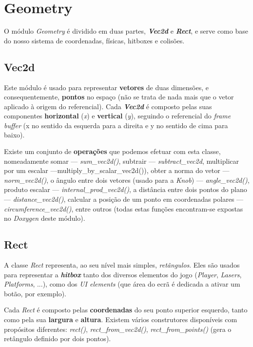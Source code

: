 \documentclass{report}
\begin{document}
\section{Geometry}

O módulo \textit{Geometry} é dividido em duas partes, \textbf{\textit{Vec2d}} e \textbf{\textit{Rect}}, e serve como base do nosso sistema de coordenadas, físicas, hitboxes e colisões. 
\subsection{Vec2d}

Este módulo é usado para representar \textbf{vetores} de duas dimensões, e consequentemente, \textbf{pontos} no espaço (não se trata de nada mais que o vetor aplicado à origem do referencial). Cada \textbf{\textit{Vec2d}} é composto pelas suas componentes \textbf{horizontal} (\textit{x}) e \textbf{vertical} (\textit{y}), seguindo o referencial do \textit{frame buffer} (x no sentido da esquerda para a direita e y no sentido de cima para baixo).

Existe um conjunto de \textbf{operações} que podemos efetuar com esta classe, nomeadamente somar --- \textit{sum\_vec2d()}, subtrair --- \textit{subtract\_vec2d}, multiplicar por um escalar ---multiply\_by\_scalar\_vec2d()), obter a norma do vetor --- \textit{norm\_vec2d()}, o ângulo entre dois vetores (usado para a \textit{Knob}) --- \textit{angle\_vec2d()}, produto escalar --- \textit{internal\_prod\_vec2d()}, a distância entre dois pontos do plano --- \textit{distance\_vec2d()}, calcular a posição de um ponto em coordenadas polares --- \textit{circumference\_vec2d()}, entre outros (todas estas funções encontram-se expostas no \textit{Doxygen} deste módulo).

\subsection{Rect}

A classe \textit{Rect} representa, ao seu nível mais simples, \textit{retângulos}. Eles são usados para representar a \textbf{\textit{hitbox}} tanto dos diversos elementos do jogo (\textit{Player}, \textit{Lasers}, \textit{Platforms}, ...), como dos \textit{UI elements} (que área do ecrã é dedicada a ativar um botão, por exemplo).

Cada \textit{Rect} é composto pelas \textbf{coordenadas} do seu ponto superior esquerdo, tanto como pela sua \textbf{largura} e \textbf{altura}. Existem vários construtores disponíveis com propósitos diferentes: \textit{rect()}, \textit{rect\_from\_vec2d()}, \textit{rect\_from\_points()} (gera o retângulo definido por dois pontos).
\end{document}
